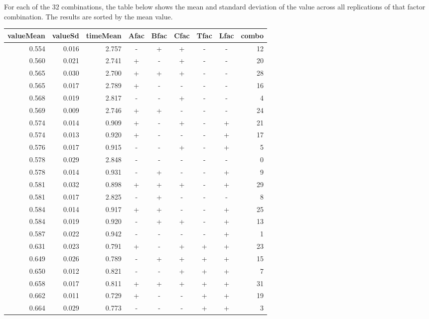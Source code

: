 \documentclass[11pt]{article}
\begin{document}
For each of the $32$ combinations, the table below shows the mean and
standard deviation of the value across all replications of that factor
combination.  The results are sorted by the mean value.

\begin{table}[ht]
\centering
\begin{tabular}{rrrcccccr}
  \hline
valueMean & valueSd & timeMean & Afac & Bfac & Cfac & Tfac & Lfac & combo \\ 
  \hline
0.554 & 0.016 & 2.757 & - & + & + & - & - & 12 \\ 
  0.560 & 0.021 & 2.741 & + & - & + & - & - & 20 \\ 
  0.565 & 0.030 & 2.700 & + & + & + & - & - & 28 \\ 
  0.565 & 0.017 & 2.789 & + & - & - & - & - & 16 \\ 
  0.568 & 0.019 & 2.817 & - & - & + & - & - & 4 \\ 
  0.569 & 0.009 & 2.746 & + & + & - & - & - & 24 \\ 
  0.574 & 0.014 & 0.909 & + & - & + & - & + & 21 \\ 
  0.574 & 0.013 & 0.920 & + & - & - & - & + & 17 \\ 
  0.576 & 0.017 & 0.915 & - & - & + & - & + & 5 \\ 
  0.578 & 0.029 & 2.848 & - & - & - & - & - & 0 \\ 
  0.578 & 0.014 & 0.931 & - & + & - & - & + & 9 \\ 
  0.581 & 0.032 & 0.898 & + & + & + & - & + & 29 \\ 
  0.581 & 0.017 & 2.825 & - & + & - & - & - & 8 \\ 
  0.584 & 0.014 & 0.917 & + & + & - & - & + & 25 \\ 
  0.584 & 0.019 & 0.920 & - & + & + & - & + & 13 \\ 
  0.587 & 0.022 & 0.942 & - & - & - & - & + & 1 \\ 
  0.631 & 0.023 & 0.791 & + & - & + & + & + & 23 \\ 
  0.649 & 0.026 & 0.789 & - & + & + & + & + & 15 \\ 
  0.650 & 0.012 & 0.821 & - & - & + & + & + & 7 \\ 
  0.658 & 0.017 & 0.811 & + & + & + & + & + & 31 \\ 
  0.662 & 0.011 & 0.729 & + & - & - & + & + & 19 \\ 
  0.664 & 0.029 & 0.773 & - & - & - & + & + & 3 \\ 

\end{tabular}
\end{table}
\end{document}
